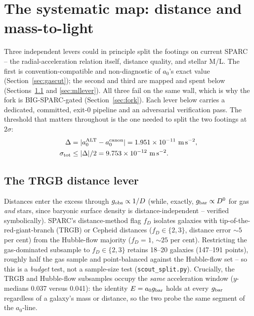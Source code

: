 \documentclass[fleqn,usenatbib]{mnras}
\begin{document}

\section{The systematic map: distance and mass-to-light}
\label{sec:systematics}

Three independent levers could in principle split the footings on current SPARC -- the radial-acceleration relation itself, distance quality, and stellar M/L. The first is convention-compatible and non-diagnostic of $a_0$'s exact value (Section~\ref{sec:gascut}); the second and third are mapped and spent below (Sections~\ref{sec:trgb} and \ref{sec:mllever}). All three fail on the same wall, which is why the fork is BIG-SPARC-gated (Section~\ref{sec:fork}). Each lever below carries a dedicated, committed, exit-0 pipeline and an adversarial verification pass. The threshold that matters throughout is the one needed to split the two footings at $2\sigma$:
\begin{equation}
\begin{split}
\Delta&=|a_0^{\rm ALT}-a_0^{\rm canon}|=1.951\times10^{-11}\ {\rm m\,s^{-2}},\\
\sigma_{\rm tot}&\le|\Delta|/2=9.753\times10^{-12}\ {\rm m\,s^{-2}}.
\end{split}
\label{eq:threshold}
\end{equation}

\subsection{The TRGB distance lever}
\label{sec:trgb}

Distances enter the excess through $g_{\rm obs}\propto1/D$ (while, exactly, $g_{\rm bar}\propto D^0$ for gas \emph{and} stars, since baryonic surface density is distance-independent -- verified symbolically). SPARC's distance-method flag $f_D$ isolates galaxies with tip-of-the-red-giant-branch (TRGB) or Cepheid distances ($f_D\in\{2,3\}$, distance error ${\sim}5$ per cent) from the Hubble-flow majority ($f_D=1$, ${\sim}25$ per cent). Restricting the gas-dominated subsample to $f_D\in\{2,3\}$ retains 18--20 galaxies (147--191 points), roughly half the gas sample and point-balanced against the Hubble-flow set -- so this is a \emph{budget} test, not a sample-size test (\texttt{scout\_split.py}). Crucially, the TRGB and Hubble-flow subsamples occupy the \emph{same} acceleration window ($y$-medians 0.037 versus 0.041): the identity $E=a_0 g_{\rm bar}$ holds at every $g_{\rm bar}$ regardless of a galaxy's mass or distance, so the two probe the same segment of the $a_0$-line.
\end{document}
